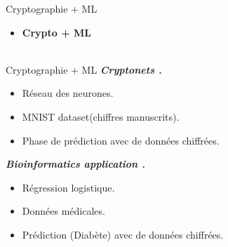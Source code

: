 \documentclass{beamer}
\begin{document}
  \begin{frame}{Cryptographie + ML}

    \begin{itemize}
    \item<1-> {
      \textbf{Crypto + ML}\\
       \\
              }
  \end{itemize}
  \end{frame}
  \begin{frame}{Cryptographie + ML}
  \textbf{\textit{Cryptonets .}}\newline
  \begin{itemize}
    \item{Réseau des neurones.}
    \item{MNIST dataset(chiffres manuscrits).}
    \item{Phase de prédiction avec de données chiffrées.}
    \end{itemize}
\textbf{\textit{Bioinformatics application .}}\newline
  \begin{itemize}
    \item{Régression logistique.}
    \item{Données médicales.}
    \item{Prédiction (Diabète) avec de données chiffrées.}
  \end{itemize}
  \end{frame}
\end{document}

